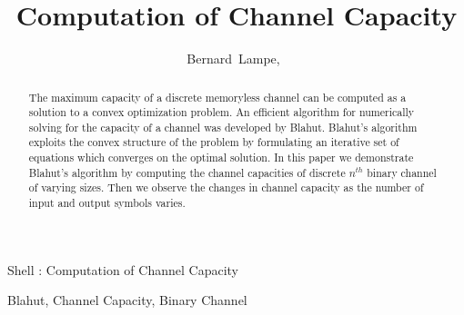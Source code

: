 \documentclass[journal]{IEEEtran}
\begin{document}
\title{Computation of Channel Capacity}

\author{Bernard~Lampe,~}

%
{Shell \MakeLowercase{\Lampe}: Computation of Channel Capacity}

\maketitle

\begin{abstract}
The maximum capacity of a discrete memoryless channel can be computed as a solution to a convex optimization problem. An efficient algorithm for numerically solving for the capacity of a channel was developed by Blahut. Blahut's algorithm exploits the convex structure of the problem by formulating an iterative set of equations which converges on the optimal solution. In this paper we demonstrate Blahut's algorithm by computing the channel capacities of discrete \(n^{th}\) binary channel of varying sizes. Then we observe the changes in channel capacity as the number of input and output symbols varies.
\end{abstract}

\begin{IEEEkeywords}
Blahut, Channel Capacity, Binary Channel
\end{IEEEkeywords}

\end{document}
